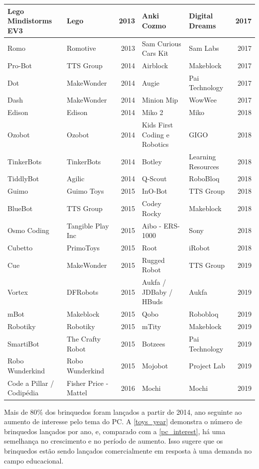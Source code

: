 {\begin{landscape}
\begin{small}
\begin{longtable}{|p{4.5cm} p{4.5cm} r| p{4.5cm} p{4.5cm} r|}
    Lego Mindistorms EV3 & Lego & 2013 &
    Anki Cozmo & Digital Dreams & 2017 \\ \hline
    Romo & Romotive & 2013 &
    Sam Curious Cars Kit & Sam Labs & 2017 \\ \hline
    Pro-Bot & TTS Group & 2014 &
    Airblock & Makeblock & 2017 \\ \hline
    Dot & MakeWonder & 2014 &
    Augie & Pai Technology & 2017 \\ \hline
    Dash & MakeWonder & 2014 &
    Minion Mip & WowWee & 2017 \\ \hline
    Edison & Edison & 2014 &
    Miko 2 & Miko & 2018 \\ \hline
    Ozobot & Ozobot & 2014 &
    Kids First Coding e Robotics & GIGO & 2018 \\ \hline
    TinkerBots & TinkerBots & 2014 &
    Botley & Learning Resources & 2018 \\ \hline
    TiddlyBot & Agilic & 2014 &
    Q-Scout & RoboBloq & 2018 \\ \hline
    Guimo & Guimo Toys & 2015 &
    InO-Bot & TTS Group & 2018 \\ \hline
    BlueBot & TTS Group & 2015 &
    Codey Rocky & Makeblock & 2018 \\ \hline
    Osmo Coding & Tangible Play Inc & 2015 &
    Aibo - ERS-1000 & Sony & 2018 \\ \hline
    Cubetto & PrimoToys & 2015 &
    Root & iRobot & 2018 \\ \hline
    Cue & MakeWonder & 2015 &
    Rugged Robot & TTS Group & 2019 \\ \hline
    Vortex & DFRobots & 2015 &
    Aukfa / JDBaby / HBuds & Aukfa & 2019 \\ \hline
    mBot & Makeblock & 2015 &
    Qobo & Robobloq & 2019 \\ \hline
    Robotiky & Robotiky & 2015 &
    mTity & Makeblock & 2019 \\ \hline
    SmartiBot & The Crafty Robot & 2015 &
    Botzees & Pai Technology & 2019 \\ \hline
    Robo Wunderkind & Robo Wunderkind & 2015 &
    Mojobot & Project Lab & 2019 \\ \hline
    Code a Pillar / Codipédia & Fisher Price - Mattel & 2016 &
    Mochi & Mochi & 2019 \\ \hline
\end{longtable}
\end{small}
\end{landscape}

Mais de 80\% dos brinquedos foram lançados a partir de 2014, ano seguinte ao aumento de interesse pelo tema do \acl{PC}. A \autoref{toys_year} demonstra o número de brinquedos lançados por ano, e, comparado com a \autoref{pc_interest}, há uma semelhança no crescimento e no período de aumento. Isso sugere que os brinquedos estão sendo lançados comercialmente em resposta à uma demanda no campo educacional.

}
